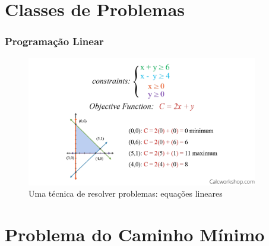 \documentclass{beamer}
\begin{document}
\section{Classes de Problemas}

\begin{frame}
	\frametitle{Programação Linear}
	
	\begin{figure}[ht!]
		\centering
		\includegraphics[width=0.9\textwidth , height=0.78\textheight]{linear-programming-example.pdf}
    	\caption{Uma técnica de resolver problemas: equações lineares} 
	\end{figure}
	
\end{frame}


\section{Problema do Caminho Mínimo}
\end{document}
